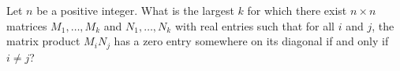 Let $n$ be a positive integer. What is the largest $k$ for which there exist $n \times n$ matrices $M_1, \dots, M_k$ and $N_1, \dots, N_k$ with real entries such that for all $i$ and $j$, the matrix product $M_i N_j$ has a zero entry somewhere on its diagonal if and only if $i \neq j$?
